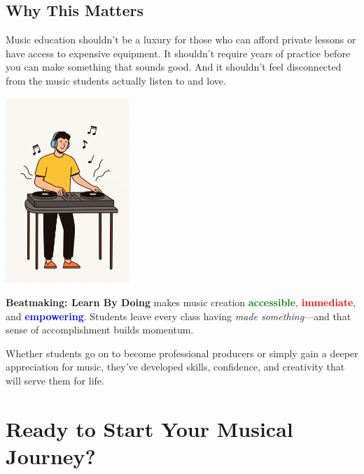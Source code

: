\documentclass[11pt,letterpaper]{article}
\newcommand{\bluepurple}[1]{\textcolor{blue}{\textbf{#1}}}
\newcommand{\greentext}[1]{\textcolor{green}{\textbf{#1}}}
\newcommand{\redtext}[1]{\textcolor{red}{\textbf{#1}}}
\begin{document}
\vspace{1.5cm}

\subsection*{Why This Matters}

Music education shouldn't be a luxury for those who can afford private lessons or have access to expensive equipment. It shouldn't require years of practice before you can make something that sounds good. And it shouldn't feel disconnected from the music students actually listen to and love.

\begin{center}
\includegraphics[width=0.35\textwidth]{Illustrations/DJ.png}
\end{center}

\textbf{Beatmaking: Learn By Doing} makes music creation \greentext{accessible}, \redtext{immediate}, and \bluepurple{empowering}. Students leave every class having \textit{made something}—and that sense of accomplishment builds momentum.

Whether students go on to become professional producers or simply gain a deeper appreciation for music, they've developed skills, confidence, and creativity that will serve them for life.

\newpage

\section*{Ready to Start Your Musical Journey?}

\begin{center}
\end{center}
\end{document}
